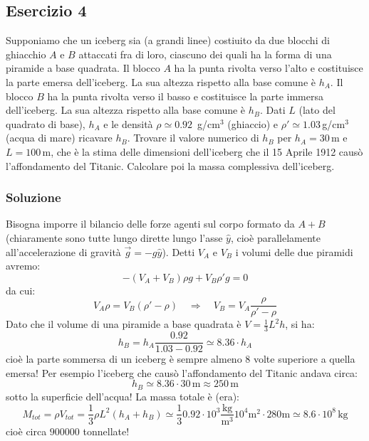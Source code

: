 \documentclass[12pt,a4paper]{book}
\begin{document}
\subsection*{Esercizio 4}
Supponiamo che un iceberg sia (a grandi linee) costiuito da due blocchi di ghiacchio $A$ e $B$ attaccati fra di loro, ciascuno dei quali ha la forma di una piramide a base quadrata. Il blocco $A$ ha la punta rivolta verso l'alto e costituisce la parte emersa dell'iceberg. La sua altezza rispetto alla base comune è $h_A$. Il blocco $B$ ha la punta rivolta verso il basso e  costituisce la parte immersa dell'iceberg. La sua altezza rispetto alla base comune è $h_B$. Dati $L$ (lato del quadrato di base), $h_A$ e le densità $\rho\simeq 0.92 \,$ g/cm$^3$  (ghiaccio) e $\rho' \simeq 1.03\,$g/cm$^3$ (acqua di mare) ricavare $h_B$. Trovare il valore numerico di $h_B$ per $h_A=30\,$m e $L=100\,$m, che è la stima delle dimensioni dell'iceberg che il 15 Aprile 1912 causò l'affondamento del Titanic. Calcolare poi la massa complessiva dell'iceberg. 

\subsubsection*{Soluzione}
Bisogna imporre il bilancio delle forze agenti sul corpo formato da $A+B$ (chiaramente sono tutte lungo dirette lungo l'asse $\hat{y}$, cioè parallelamente all'accelerazione di gravità $\vec{g}=-g \hat{y}$). Detti $V_A$ e $V_B$ i volumi delle due piramidi avremo:
\begin{equation*}
-(V_A+V_B) \rho g + V_B \rho' g=0
\end{equation*}
da cui:
\begin{equation*}
V_A \rho = V_B (\rho' - \rho) \quad \Rightarrow \quad V_B=V_A \frac{\rho}{\rho' - \rho}
\end{equation*}
Dato che il volume di una piramide a base quadrata è $V=\frac{1}{3}L^2 h$, si ha:
\begin{equation*}
h_B=h_A \frac{0.92}{1.03-0.92} \simeq 8.36 \cdot h_A  
\end{equation*}
cioè la parte sommersa di un iceberg è sempre almeno 8 volte superiore a quella emersa!
Per esempio l'iceberg che causò l'affondamento del Titanic andava circa:
\begin{equation*}
h_B\simeq 8.36 \cdot 30 \, \text{m} \approx 250 \, \text{m}
\end{equation*}
sotto la superficie dell'acqua! La massa totale è (era):
\begin{equation*}
M_{tot}=\rho V_{tot}=\frac{1}{3} \rho L^2 (h_A + h_B) \simeq \frac{1}{3}  0.92 \cdot 10^{3} \frac{\text{kg}}{\text{m}^3} 10^4 \text{m}^2 \cdot 280 \text{m} \simeq 8.6 \cdot 10^{8} \, \text{kg}
\end{equation*}
cioè circa $900 000$ tonnellate!
\end{document}

